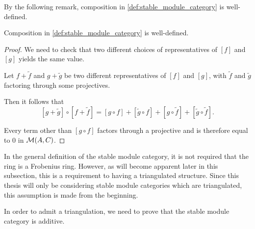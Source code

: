 By the following remark, composition in \autoref{def:stable_module_category} is well-defined.
\begin{remark}
    \label{rem:stmod_composition_well-defined}
    Composition in \autoref{def:stable_module_category} is well-defined.
\end{remark}
\begin{proof}
    We need to check that two different choices of representatives of \( [f] \) and \( [g] \) yields the same value.

    Let \( f + \widetilde{f} \) and \( g + \widetilde{g} \) be two different representatives of \( [f] \) and \( [g] \), with \( \widetilde{f} \) and \( \widetilde{g} \) factoring through some projectives.

    Then it follows that
    \[
         [g + \widetilde{g}] \circ [f + \widetilde{f}] = [g \circ f] + [\widetilde{g} \circ f] + [g \circ \widetilde{f}] + [\widetilde{g} \circ \widetilde{f}].
    \]
    
    Every term other than \( [g \circ f] \) factors through a projective and is therefore equal to \( 0 \) in \( {\mathcal{M}}(A, C) \).
\end{proof}

In the general definition of the stable module category, it is not required that the ring is a Frobenius ring. However, as will become apparent later in this subsection, this is a requirement to having a triangulated structure. Since this thesis will only be considering stable module categories which are triangulated, this assumption is made from the beginning.

In order to admit a triangulation, we need to prove that the stable module category is additive.

